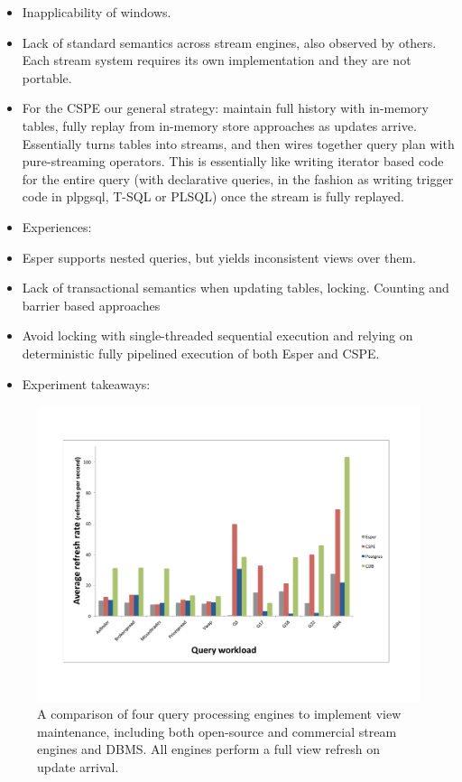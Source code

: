\begin{itemize}
  \item Inapplicability of windows.
  \item Lack of standard semantics across stream engines, also observed by
  others. Each stream system requires its own implementation and they are not
  portable.
  \item For the CSPE our general strategy: maintain full history with in-memory
  tables, fully replay from in-memory store approaches as updates arrive.
  Essentially turns tables into streams, and then wires together query plan with
  pure-streaming operators. This is essentially like writing iterator based code
  for the entire query (with declarative queries, in the fashion as writing
  trigger code in plpgsql, T-SQL or PLSQL) once the stream is fully replayed.
  \item Experiences:
  \item Esper supports nested queries, but yields inconsistent views over them.
  \item Lack of transactional semantics when updating tables, locking. Counting
  and barrier based approaches
  \item Avoid locking with single-threaded sequential execution and relying on
  deterministic fully pipelined execution of both Esper and CSPE.
  \item Experiment takeaways:
\end{itemize}


\begin{figure}[htbp]
\begin{center}
\includegraphics[scale=0.33]{../graphs/graphs/engine-comparison.pdf}
\end{center}
\vspace{-4mm}
\caption{A comparison of four query processing engines to implement view
maintenance, including both open-source and commercial stream engines and DBMS.
All engines perform a full view refresh on update arrival.}
\label{fig:enginecomp}
\end{figure}
